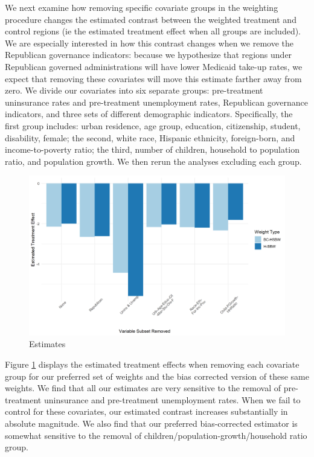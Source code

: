 \documentclass[12pt]{article}
\begin{document}
We next examine how removing specific covariate groups in the weighting procedure changes the estimated contrast between the weighted treatment and control regions (ie the estimated treatment effect when all groups are included). We are especially interested in how this contrast changes when we remove the Republican governance indicators: because we hypothesize that regions under Republican governed administrations will have lower Medicaid take-up rates, we expect that removing these covariates will move this estimate farther away from zero. We divide our covariates into six separate groups: pre-treatment uninsurance rates and pre-treatment unemployment rates, Republican governance indicators, and three sets of different demographic indicators. Specifically, the first group includes: urban residence, age group, education, citizenship, student, disability, female; the second, white race, Hispanic ethnicity, foreign-born, and income-to-poverty ratio; the third, number of children, household to population ratio, and population growth. We then rerun the analyses excluding each group. 

\begin{figure}[]
\begin{center}
    \includegraphics[scale=0.6]{01_Plots/loo-covariates-main-c1.png}
    \caption{Estimates}
    \label{loocovariates}
\end{center}
\end{figure}

Figure \ref{loocovariates} displays the estimated treatment effects when removing each covariate group for our preferred set of weights and the bias corrected version of these same weights. We find that all our estimates are very sensitive to the removal of pre-treatment uninsurance and pre-treatment unemployment rates. When we fail to control for these covariates, our estimated contrast increases substantially in absolute magnitude. We also find that our preferred bias-corrected estimator is somewhat sensitive to the removal of children/population-growth/household ratio group. 
\end{document}
